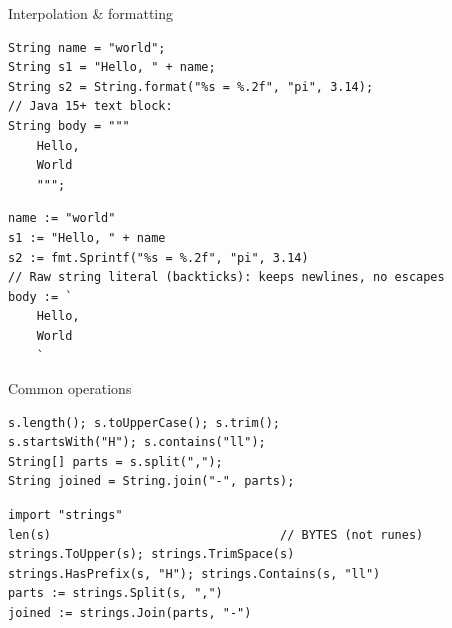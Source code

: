 \documentclass[10pt]{article}
\begin{document}
\begin{construct}{Interpolation \& formatting}
\noindent
\begin{minipage}[t]{0.485\linewidth}
\begin{lstlisting}[style=java, title=Java]
String name = "world";
String s1 = "Hello, " + name;
String s2 = String.format("%s = %.2f", "pi", 3.14);
// Java 15+ text block:
String body = """
    Hello,
    World
    """;
\end{lstlisting}
\end{minipage}\hfill
\begin{minipage}[t]{0.485\linewidth}
\begin{lstlisting}[style=go, title=Go]
name := "world"
s1 := "Hello, " + name
s2 := fmt.Sprintf("%s = %.2f", "pi", 3.14)
// Raw string literal (backticks): keeps newlines, no escapes
body := `
    Hello,
    World
    `
\end{lstlisting}
\end{minipage}
\end{construct}

\begin{construct}{Common operations}
\noindent
\begin{minipage}[t]{0.485\linewidth}
\begin{lstlisting}[style=java, title=Java]
s.length(); s.toUpperCase(); s.trim();
s.startsWith("H"); s.contains("ll");
String[] parts = s.split(",");
String joined = String.join("-", parts);
\end{lstlisting}
\end{minipage}\hfill
\begin{minipage}[t]{0.485\linewidth}
\begin{lstlisting}[style=go, title=Go]
import "strings"
len(s)                                // BYTES (not runes)
strings.ToUpper(s); strings.TrimSpace(s)
strings.HasPrefix(s, "H"); strings.Contains(s, "ll")
parts := strings.Split(s, ",")
joined := strings.Join(parts, "-")
\end{lstlisting}
\end{minipage}
\end{construct}

\end{document}
